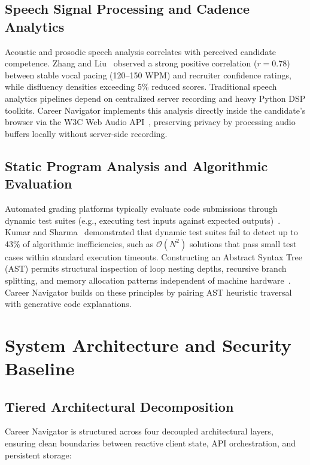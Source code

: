 \documentclass[conference]{IEEEtran}
\begin{document}
\subsection{Speech Signal Processing and Cadence Analytics}
Acoustic and prosodic speech analysis correlates with perceived candidate competence. Zhang and Liu~\cite{zhang2022acoustic} observed a strong positive correlation ($r = 0.78$) between stable vocal pacing (120--150 WPM) and recruiter confidence ratings, while disfluency densities exceeding 5\% reduced scores. Traditional speech analytics pipelines depend on centralized server recording and heavy Python DSP toolkits. Career Navigator implements this analysis directly inside the candidate's browser via the W3C Web Audio API~\cite{w3c2021webaudio}, preserving privacy by processing audio buffers locally without server-side recording.

\subsection{Static Program Analysis and Algorithmic Evaluation}
Automated grading platforms typically evaluate code submissions through dynamic test suites (e.g., executing test inputs against expected outputs)~\cite{paiva2022automated}. Kumar and Sharma~\cite{kumar2023evaluating} demonstrated that dynamic test suites fail to detect up to 43\% of algorithmic inefficiencies, such as $\mathcal{O}(N^2)$ solutions that pass small test cases within standard execution timeouts. Constructing an Abstract Syntax Tree (AST) permits structural inspection of loop nesting depths, recursive branch splitting, and memory allocation patterns independent of machine hardware~\cite{aho2006compilers}. Career Navigator builds on these principles by pairing AST heuristic traversal with generative code explanations.

\section{System Architecture and Security Baseline}

\subsection{Tiered Architectural Decomposition}
Career Navigator is structured across four decoupled architectural layers, ensuring clean boundaries between reactive client state, API orchestration, and persistent storage:
\end{document}
